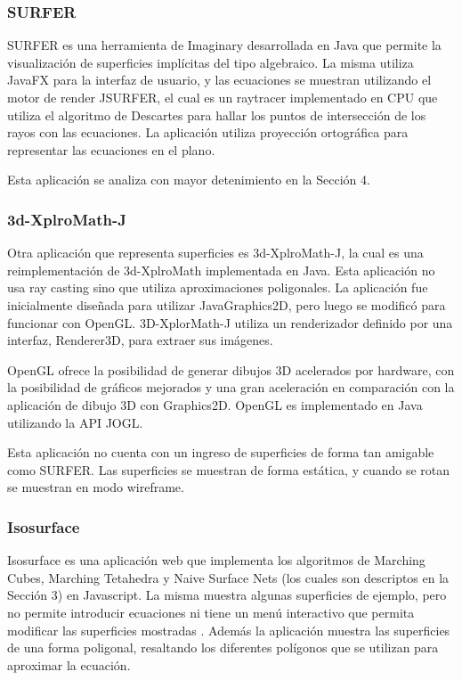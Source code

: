 \documentclass[12pt]{article}
\begin{document}
\subsubsection{SURFER}
\noindent SURFER es una herramienta de Imaginary desarrollada en Java que permite la visualización de superficies implícitas del tipo algebraico. La misma utiliza JavaFX para la interfaz de usuario, y las ecuaciones se muestran utilizando el motor de render JSURFER, el cual es un raytracer implementado en CPU que utiliza el algoritmo de Descartes para hallar los puntos de intersección de los rayos con las ecuaciones. La aplicación utiliza proyección ortográfica para representar las ecuaciones en el plano.

Esta aplicación se analiza con mayor detenimiento en la Sección 4.
\subsubsection{3d-XplroMath-J}
\noindent Otra aplicación que representa superficies es 3d-XplroMath-J, la cual es una reimplementación de 3d-XplroMath implementada en Java. Esta aplicación no usa ray casting sino que utiliza aproximaciones poligonales. La aplicación fue inicialmente diseñada para utilizar JavaGraphics2D, pero luego se modificó para funcionar con OpenGL. 3D-XplorMath-J utiliza un  renderizador definido por una interfaz, Renderer3D, para extraer sus imágenes. 

OpenGL ofrece la posibilidad de generar dibujos 3D acelerados por hardware, con la posibilidad de gráficos mejorados y una gran aceleración en comparación con la aplicación de dibujo 3D con Graphics2D. OpenGL es implementado en Java utilizando la API JOGL.

Esta aplicación no cuenta con un ingreso de superficies de forma tan amigable como SURFER. Las superficies se muestran de forma estática, y cuando se rotan se muestran en modo wireframe.
\subsubsection{Isosurface}
\noindent Isosurface es una aplicación web que implementa los algoritmos de Marching Cubes, Marching Tetahedra y Naive Surface Nets (los cuales son descriptos en la Sección 3) en Javascript. La misma muestra algunas superficies de ejemplo, pero no permite introducir ecuaciones ni tiene un menú interactivo que permita modificar las superficies mostradas . Además la aplicación muestra las superficies de una forma poligonal, resaltando los diferentes polígonos que se utilizan para aproximar la ecuación.  
\end{document}
